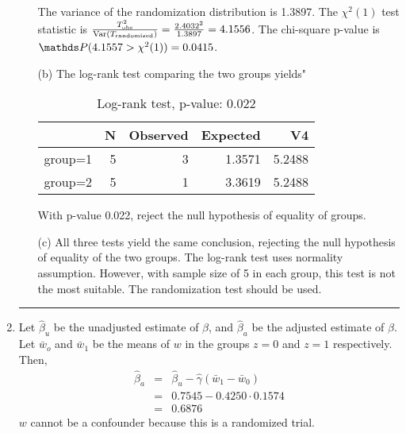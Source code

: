 \documentclass[11pt,a4paper]{article}
\begin{document}
\begin{enumerate}
\begin{enumerate}
The variance of the randomization distribution is 1.3897. The $\chi^2(1)$ test statistic is $\frac{T^2_{\text{obs}}}{\operatorname{Var}(T_{\text{randomized}})} = \frac{2.4032^2}{1.3897} = 4.1556$. The chi-square p-value is $\Prob(4.1557 > \chi^2(1)) = 0.0415$.  

\item[(b)] The log-rank test comparing the two groups yields"
\begin{table}[H]
\centering
\begin{tabular}{rrrrr}
  \hline
 & N & Observed & Expected & V4 \\ 
  \hline
group=1 & 5 & 3 & 1.3571 & 5.2488 \\ 
  group=2 & 5 & 1 & 3.3619 & 5.2488 \\ 
   \hline
\end{tabular}
\caption{Log-rank test, p-value: 0.022}
\end{table}
With p-value 0.022, reject the null hypothesis of equality of groups. 
\item[(c)] All three tests yield the same conclusion, rejecting the null hypothesis of equality of the two groups. The log-rank test uses normality assumption. However, with sample size of 5 in each group, this test is not the most suitable. The randomization test should be used.
\end{enumerate}

\rule{\textwidth}{1pt}
\vspace{1in}
\item
Let $\hat{\beta}_u$ be the unadjusted estimate of $\beta$, and $\hat{\beta}_a$ be the adjusted estimate of $\beta$. Let $\bar{w}_o$ and $\bar{w}_1$ be the means of $w$ in the groups $z = 0$ and $z = 1$ respectively. Then,
\begin{eqnarray*}
\hat{\beta}_a & = & \hat{\beta}_u - \hat{\gamma}(\bar{w}_1 - \bar{w}_0) \\
              & = & 0.7545 - 0.4250 \cdot 0.1574 \\
              & = & 0.6876
\end{eqnarray*}
$w$ cannot be a confounder because this is a randomized trial.


\end{enumerate}
\end{document}
